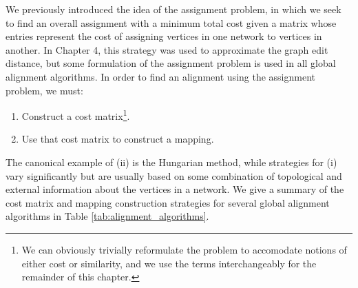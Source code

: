 \documentclass[12pt]{thesis}
\theoremstyle{plain}
\theoremstyle{definition}
\theoremstyle{remark}
\begin{document}
We previously introduced the idea of the assignment problem, in which we seek to find an overall assignment with a minimum total cost given a matrix whose entries represent the cost of assigning vertices in one network to vertices in another. In Chapter 4, this strategy was used to approximate the graph edit distance, but some formulation of the assignment problem is used in all global alignment algorithms. In order to find an alignment using the assignment problem, we must:

\begin{enumerate}
\item Construct a cost matrix\footnote{We can obviously trivially reformulate the problem to accomodate notions of either cost or similarity, and we use the terms interchangeably for the remainder of this chapter.}.
\item Use that cost matrix to construct a mapping.
\end{enumerate}

The canonical example of (ii) is the Hungarian method, while strategies for (i) vary significantly but are usually based on some combination of topological and external information about the vertices in a network. We give a summary of the cost matrix and mapping construction strategies for several global alignment algorithms in Table \ref{tab:alignment_algorithms}.
\end{document}
